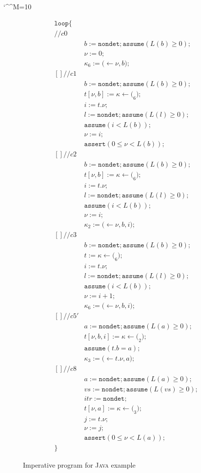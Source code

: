 \documentclass[nocopyrightspace]{sigplanconf}
\makeatletter
\newcommand\Java{\textsc{Java}\xspace}
\def\@comment{\let\do\@makeother \dospecials\catcode`\^^M=10\def\par{}}
\def\begincomment{\@comment\@xcomment}
\newenvironment{comment}{\begincomment}{}
\def\valu{\nu}
\newcommand{\ASSERT}[2]{\{{#1}\}\ {#2}}
\newcommand{\kvar}{\kappa}
\def\NONDET{\mathtt{nondet}}
\newcommand{\TASSIGN}[2]{{#1} \leftarrow {#2}}
\def\ASSUME{{{\mathtt{assume}}}}
\def\ASSERT{{{\mathtt{assert}}}}
\newcommand{\GET}[2]{\TASSIGN{#2}{#1}}
\newcommand{\SET}[2]{\TASSIGN{#1}{#2}}
\def\LOOP{{{\mathtt{loop}}}}
\def\CHOICE{{\mathrm{[\!] }}}
\makeatother
\begin{document}
\begin{comment}
\begin{figure}[t]
\begin{small}
\[
\begin{array}{ll}
\LOOP \{ \\
// c0\\
& b := \NONDET; \ASSUME(L(b)\geq 0);\\
& \valu := 0;\\
& \kvar_6 := \SET(\valu, b);\\
\CHOICE // c1 \\
& b := \NONDET; \ASSUME(L(b)\geq 0);\\
& t[\valu, b] := \GET(\kvar_6);\\
& i := t.\valu;\\
& l := \NONDET; \ASSUME(L(l) \geq 0);\\
& \ASSUME(i < L(b));\\ 
& \valu := i;\\
& \ASSERT(0 \leq \valu < L(b));\\
\CHOICE // c2 \\
& b := \NONDET; \ASSUME(L(b)\geq 0);\\
& t[\valu, b] := \GET(\kvar_6);\\
& i := t.\valu; \\
& l := \NONDET; \ASSUME(L(l)\geq 0);\\
& \ASSUME(i < L(b));\\
& \valu := i ;\\
& \kvar_2 := \SET(\valu, b, i);\\
\CHOICE // c3 \\
& b := \NONDET; \ASSUME(L(b)\geq 0);\\
& t := \GET(\kvar_6);\\
& i := t.\valu;\\
& l := \NONDET; \ASSUME(L(l)\geq 0);\\
& \ASSUME(i < L(b));\\
& \valu := i + 1;\\
& \kvar_6 := \SET(\valu, b, i);\\
\CHOICE // c5'\\
& a := \NONDET; \ASSUME(L(a)\geq 0);\\
& t[\valu,b,i] := \GET(\kvar_2);\\
& \ASSUME(t.b = a);\\
& \kvar_3 := \SET(t.\valu, a);\\
\CHOICE // c8 \\
& a := \NONDET; \ASSUME(L(a)\geq 0);\\
& vs := \NONDET; \ASSUME(L(vs)\geq 0);\\
& itr := \NONDET;\\
& t[\valu,a] := \GET(\kvar_3);\\
& j := t.\valu;\\
& \valu := j;\\
& \ASSERT(0\leq \valu < L(a));\\
\}
\end{array}
\]
\end{small}
\caption{Imperative program for \Java example}
\label{ex-java-imperative}
\end{figure}
\end{comment}
\end{document}
